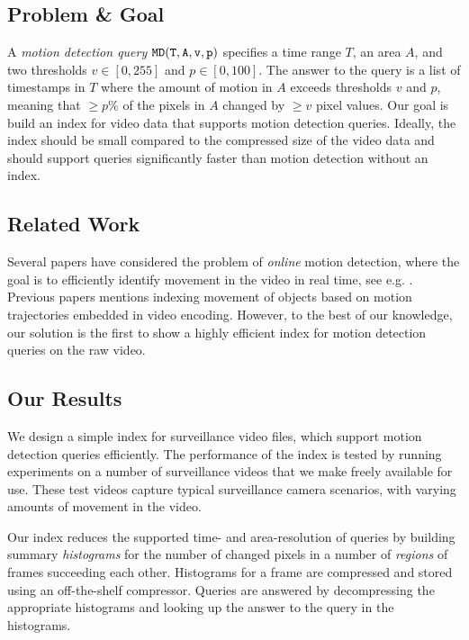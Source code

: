 


\subsection*{Problem \& Goal}
A \emph{motion detection query} $\mathtt{MD(T, A, v, p)}$ specifies a time range $T$, an area $A$, and two thresholds $v \in [0, 255]$ and $p \in [0, 100]$. The answer to the query is a list of timestamps in $T$ where the amount of motion in $A$ exceeds thresholds $v$ and $p$, meaning that $\geq p\%$ of the pixels in $A$ changed by $\geq v$ pixel values. Our goal is build an index for video data that supports motion detection queries. Ideally, the index should be small compared to the compressed size of the video data and should support queries significantly faster than motion detection without an index. 

\subsection*{Related Work}
Several papers have considered the problem of \emph{online} motion detection, where the goal is to efficiently identify movement in the video in real time, see e.g. \cite{sachs1994real, tian2005robust, hu2004survey, cutler2000robust, huang2011advanced}. Previous papers \cite{du2014event, kao2008a} mentions indexing movement of objects based on motion trajectories embedded in video encoding. However, to the best of our knowledge, our solution is the first to show a highly efficient index for motion detection queries on the raw video. 

\subsection*{Our Results}
We design a simple index for surveillance video files, which support motion detection queries efficiently. The performance of the index is tested by running experiments on a number of surveillance videos that we make freely available for use. These test videos capture typical surveillance camera scenarios, with varying amounts of movement in the video.

Our index reduces the supported time- and area-resolution of queries by building summary \emph{histograms} for the number of changed pixels in a number of \emph{regions} of frames succeeding each other. Histograms for a frame are compressed and stored using an off-the-shelf compressor. Queries are answered by decompressing the appropriate histograms and looking up the answer to the query in the histograms.

